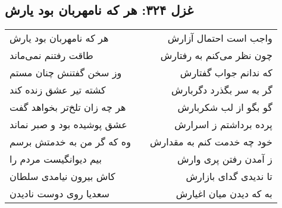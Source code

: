 \begin{center}
\section*{غزل ۳۲۴: هر که نامهربان بود یارش}
\label{sec:324}
\begin{longtable}{l p{0.5cm} r}
هر که نامهربان بود یارش
&&
واجب است احتمال آزارش
\\
طاقت رفتنم نمی‌ماند
&&
چون نظر می‌کنم به رفتارش
\\
وز سخن گفتنش چنان مستم
&&
که ندانم جواب گفتارش
\\
کشته تیر عشق زنده کند
&&
گر به سر بگذرد دگربارش
\\
هر چه زان تلخ‌تر بخواهد گفت
&&
گو بگو از لب شکربارش
\\
عشق پوشیده بود و صبر نماند
&&
پرده برداشتم ز اسرارش
\\
وه که گر من به خدمتش برسم
&&
خود چه خدمت کنم به مقدارش
\\
بیم دیوانگیست مردم را
&&
ز آمدن رفتن پری وارش
\\
کاش بیرون نیامدی سلطان
&&
تا ندیدی گدای بازارش
\\
سعدیا روی دوست نادیدن
&&
به که دیدن میان اغیارش
\\
\end{longtable}
\end{center}
